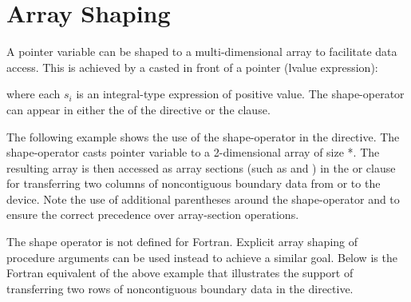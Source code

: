 \section{Array Shaping}
\label{sec:array-shaping}



\begin{ccppspecific}
A pointer variable can be shaped to a multi-dimensional array to facilitate
data access. This is achieved by a  casted in front of 
a pointer (lvalue expression):
\begin{description}
\item[]\hspace*{5mm}
\end{description}
where each $s_i$ is an integral-type expression of positive value.
The shape-operator can appear in either the 
of the  directive or the  clause.

The following example shows the use of the shape-operator in the 
 directive. The shape-operator \ucode{([nx][ny+2])}
casts pointer variable  to a 2-dimensional array of size
*.  The resulting array is then accessed as
array sections (such as \ucode{[0:nx][1]} and \ucode{[0:nx][ny]}) 
in the  or  clause for transferring two columns of 
noncontiguous boundary data from or to the device.  
Note the use of additional parentheses
around the shape-operator and  to ensure the correct precedence 
over array-section operations.

\end{ccppspecific}

\begin{fortranspecific}
The shape operator is not defined for Fortran.  Explicit array shaping
of procedure arguments can be used instead to achieve a similar goal.
Below is the Fortran equivalent of the above example that illustrates
the support of transferring two rows of noncontiguous boundary
data in the  directive.
 
\end{fortranspecific}
